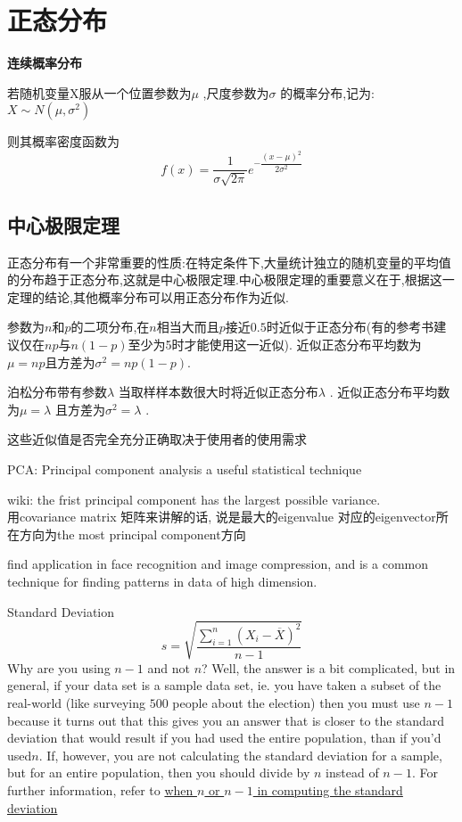 \documentclass[openany]{book}
\begin{document}
\section{正态分布}
\textbf{连续概率分布}

若随机变量X服从一个位置参数为$\mu$ ,尺度参数为$\sigma$ 的概率分布,记为:$X\sim N(\mu ,\sigma ^{2})$

则其概率密度函数为
$$f(x)=\frac{1}{\sigma {\sqrt  {2\pi }}} e^{{- \dfrac{(x-\mu )^{2}}{2\sigma ^{2}}}}$$

\subsection{中心极限定理}
正态分布有一个非常重要的性质:在特定条件下,大量统计独立的随机变量的平均值的分布趋于正态分布,这就是中心极限定理.中心极限定理的重要意义在于,根据这一定理的结论,其他概率分布可以用正态分布作为近似.

参数为$n$和$p$的二项分布,在$n$相当大而且$p$接近$0.5$时近似于正态分布(有的参考书建议仅在$np$与$n(1-p)$至少为5时才能使用这一近似).
近似正态分布平均数为$\mu =np$且方差为$\sigma ^{2}=np(1-p)$.

泊松分布带有参数$\lambda$ 当取样样本数很大时将近似正态分布$\lambda$ .
近似正态分布平均数为$\mu =\lambda$ 且方差为$\sigma ^{2}=\lambda$ .

这些近似值是否完全充分正确取决于使用者的使用需求

PCA: Principal component analysis
a useful statistical technique

wiki: the frist principal component has the largest possible variance.\\
用covariance matrix 矩阵来讲解的话, 说是最大的eigenvalue 对应的eigenvector所在方向为the most principal component方向

find application in face recognition and image compression, and is a common technique for finding patterns in data of high dimension.

Standard Deviation
$$
s = \sqrt{\dfrac{\sum_{i=1}^n (X_i - \overline{X})^2}{n-1}}
$$
Why are you using $n-1$ and not $n$?
Well, the answer is a bit complicated, but in general, if your data set is a sample data set, ie. you have taken a subset of the real-world (like surveying $500$ people about the election) then you must use $n-1$ because it turns out that this gives you an answer that is closer to the standard deviation that would result if you had used the entire population, than if you'd used$n$. If, however, you are not calculating the standard deviation for a sample, but for an entire population, then you should divide by $n$ instead of $n-1$. 
For further information, refer to \href{http://mathcentral.uregina.ca/RR/database/RR.09.95/weston2.html}{when $n$ or $n-1$ in computing the standard deviation}
\end{document}
